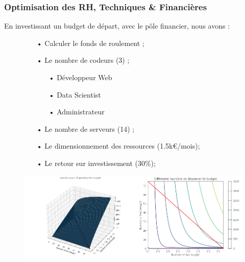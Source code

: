 \documentclass[9pt]{beamer}
\begin{document}
\begin{frame}
	\frametitle{Optimisation des RH, Techniques \& Financières}
	En investissant un budget de départ, avec le pôle financier, nous avons :
\begin{figure}[!htb]
   \begin{minipage}{0.5\textwidth}
     \centering
     \begin{itemize} 
		\item[•] Calculer le fonds de roulement ;
      	\item[•] Le nombre de codeurs (3) ;
      	\begin{itemize}
      		\item[•] Développeur Web
      		\item[•] Data Scientist
      		\item[•] Administrateur 
      	\end{itemize}
     	\item[•] Le nombre de serveurs (14) ;
     	\item[•] Le dimensionnement des ressources (1.5k€/mois);
     	\item[•] Le retour sur investissement (30\%);
	 \end{itemize}	
   \end{minipage}\hfill
   \begin{minipage}{0.5\textwidth}
     \centering
     \includegraphics[width=1\linewidth]{../plots/optimisation}
     \label{Fig:optimisation}
   \end{minipage}
\end{figure}
\end{frame}
\end{document}
